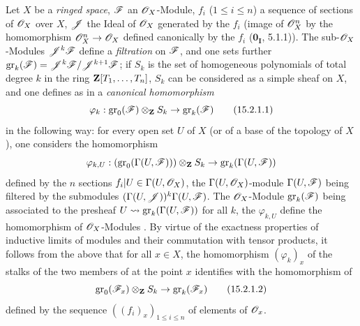 \begin{env}[15.2.1]
\label{0.15.2.1}
Let $X$ be a \emph{ringed space}, $\mathscr{F}$ an $\mathscr{O}_X$-Module, $f_i$ ($1\leq i\leq n$) a sequence of sections of $\mathscr{O}_X$ over $X$, $\mathscr{J}$ the Ideal of $\mathscr{O}_X$ generated by the $f_i$ (image of $\mathscr{O}_X^n$ by the homomorphism $\mathscr{O}_X^n\to\mathscr{O}_X$ defined canonically by the $f_i$ ($\mathbf{0_I}$, 5.1.1)).
The sub-$\mathscr{O}_X$-Modules $\mathscr{J}^k\mathscr{F}$ define a \emph{filtration} on $\mathscr{F}$, and one sets further $\operatorname{gr}_k(\mathscr{F})=\mathscr{J}^k\mathscr{F}/\mathscr{J}^{k+1}\mathscr{F}$;
if $S_k$ is the set of homogeneous polynomials of total degree $k$ in the ring $\mathbf{Z}[T_1,\ldots,T_n]$, $S_k$ can be considered as a simple sheaf on $X$, and one defines as in  a \emph{canonical homomorphism}
\[
\label{0.15.2.1.1}
  \varphi_k : \operatorname{gr}_0(\mathscr{F})\otimes_{\mathbf{Z}} S_k \to \operatorname{gr}_k(\mathscr{F})
\tag{15.2.1.1}
\]
in the following way:
for every open set $U$ of $X$ (or of a base of the topology of $X$), one considers the homomorphism 
\[
  \varphi_{k,U} : (\operatorname{gr}_0(\Gamma(U,\mathscr{F})))\otimes_{\mathbf{Z}}S_k \to \operatorname{gr}_k(\Gamma(U,\mathscr{F}))
\]
defined by the $n$ sections $f_i|U\in\Gamma(U,\mathscr{O}_X)$, the $\Gamma(U,\mathscr{O}_X)$-module $\Gamma(U,\mathscr{F})$ being filtered by the submodules $(\Gamma(U,\mathscr{J}))^k\Gamma(U,\mathscr{F})$.
The $\mathscr{O}_X$-Module $\operatorname{gr}_k(\mathscr{F})$ being associated to the presheaf $U\leadsto\operatorname{gr}_k(\Gamma(U,\mathscr{F}))$ for all $k$, the $\varphi_{k,U}$ define the homomorphism of $\mathscr{O}_X$-Modules .
By virtue of the exactness properties of inductive limits of modules and their commutation with tensor products, it follows from the above that for all $x\in X$, the homomorphism $(\varphi_k)_x$ of the stalks of the two members of  at the point $x$ identifies with the homomorphism of 
\[
\label{0.15.2.1.2}
  \operatorname{gr}_0(\mathscr{F}_x)\otimes_{\mathbf{Z}}S_k \to \operatorname{gr}_k(\mathscr{F}_x)
\tag{15.2.1.2}
\]
defined by the sequence $((f_i)_x)_{1\leq i\leq n}$ of elements of $\mathscr{O}_x$.
\end{env}

